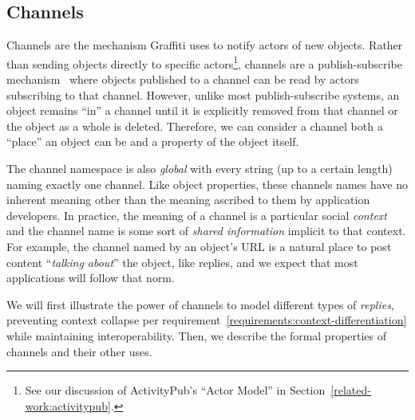 

\subsection{Channels}
\label{concepts:channels}

Channels are the mechanism Graffiti uses to notify
actors of new objects.
Rather than sending objects directly to specific actors\footnote{
    See our discussion of ActivityPub's ``Actor Model'' in Section~\ref{related-work:activitypub}.
},
channels are a publish-subscribe mechanism~\cite{pubsub}
where objects published to a channel
can be read by actors subscribing to that channel.
However, unlike most publish-subscribe systems,
an object remains ``in'' a channel until
it is explicitly removed from that channel
or the object as a whole is deleted.
Therefore, we can consider a channel both a ``place''
an object can be and a property of the object itself.

The channel namespace is also \emph{global} with every string (up to a certain length)
naming exactly one channel.
Like object properties, these channels names have no inherent meaning
other than the meaning ascribed to them by application developers.
In practice, the meaning of a channel is a particular social \emph{context} and the channel
name is some sort of \emph{shared information} implicit to that context.
For example, the channel named by an object's URL is a natural place to post content ``\emph{talking about}'' the object, like replies, and we expect that most applications will follow that norm.  

We will first illustrate the power of channels
to model different types of \emph{replies},
preventing context collapse per requirement~\ref{requirements:context-differentiation}
while maintaining interoperability.
Then, we describe the formal properties of channels and their other uses.


